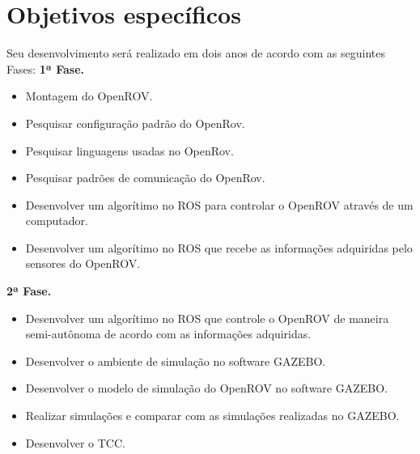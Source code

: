 \section{Objetivos específicos}
Seu desenvolvimento será realizado em dois anos de acordo com as seguintes Fases:
\textbf{\large 1ª Fase.}
 
\begin{itemize}

	\item Montagem do OpenROV.
	\item Pesquisar configuração padrão do OpenRov.
	\item Pesquisar linguagens usadas no OpenRov.
	\item Pesquisar padrões de comunicação do OpenRov.
	\item Desenvolver um algorítimo no ROS para controlar o OpenROV através de um computador.
	\item Desenvolver um algorítimo no ROS que recebe as informações adquiridas pelo sensores do OpenROV.
\end{itemize}

 \textbf{\large 2ª Fase.}
 
\begin{itemize}

	\item Desenvolver um algorítimo no ROS que controle o OpenROV de maneira semi-autônoma de acordo com as informações adquiridas.
    \item Desenvolver o ambiente de simulação no software GAZEBO.
	\item Desenvolver o modelo de simulação do OpenROV no software GAZEBO.
	\item Realizar simulações e comparar com as simulações realizadas no GAZEBO.
	\item Desenvolver o TCC.

\end{itemize}
